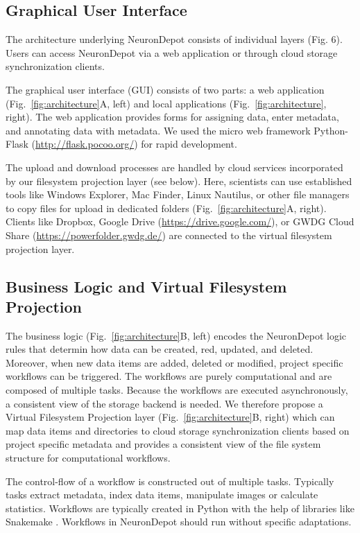 \documentclass{frontiersSCNS} %
\begin{document}
\subsection{Graphical User Interface}
The architecture underlying NeuronDepot consists of individual layers (Fig. 6). Users can access NeuronDepot via a web application or through cloud storage synchronization clients.

The graphical user interface (GUI) consists of two parts: a web application
(Fig.~\ref{fig:architecture}A, left) and local applications
(Fig.~\ref{fig:architecture}, right). The web application provides forms for
assigning data, enter metadata, and annotating data with metadata. We used
the micro web framework Python-Flask (\url{http://flask.pocoo.org/}) for rapid
development.

The upload and download processes are handled by cloud services incorporated by
our filesystem projection layer (see below). Here, scientists can use
established tools like Windows Explorer, Mac Finder, Linux Nautilus, or other
file managers to copy files for upload in dedicated folders
(Fig.~\ref{fig:architecture}A, right).  Clients like Dropbox, Google Drive
(\url{https://drive.google.com/}), or GWDG Cloud Share
(\url{https://powerfolder.gwdg.de/}) are connected to the virtual filesystem
projection layer. 


\subsection{Business Logic and Virtual Filesystem Projection}\label{sec:projection_layer}

The business logic (Fig.~\ref{fig:architecture}B, left) encodes the NeuronDepot
logic rules that determin how data can be created, red, updated, and deleted.
Moreover, when new data items are added, deleted or modified, project specific
workflows can be triggered.  The workflows are purely computational and are
composed of multiple tasks. Because the workflows are executed asynchronously,
a consistent view of the storage backend is needed. We therefore propose a
Virtual Filesystem Projection layer (Fig.~\ref{fig:architecture}B, right) which
can map data items and directories to cloud storage synchronization clients
based on project specific metadata and provides a consistent view of the file
system structure for computational workflows.

The control-flow of a workflow is constructed out of multiple tasks. Typically
tasks extract metadata, index data items, manipulate images or calculate
statistics. Workflows are typically created in Python with the help of
libraries like Snakemake \citep{Koester2012}. Workflows in NeuronDepot should run
without specific adaptations.
\end{document}
